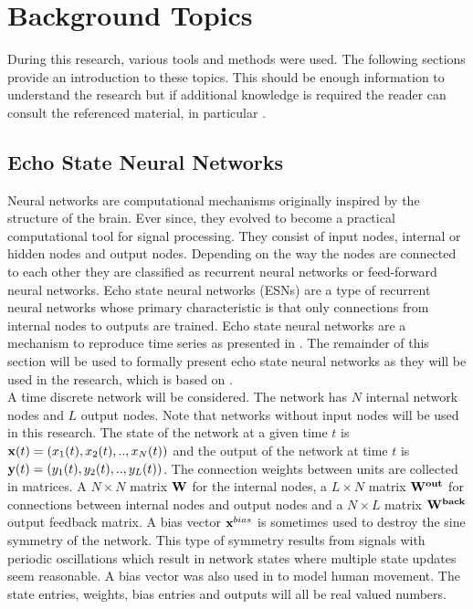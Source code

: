 \documentclass[letterpaper,9pt]{article}
\begin{document}
\section{Background Topics}

During this research, various tools and methods were used. The following sections provide an introduction to these topics. This should be enough information to understand the research but if additional knowledge is required the reader can consult the referenced material, in particular \cite{JaegerESNTutorial}.

\subsection{Echo State Neural Networks}

Neural networks are computational mechanisms originally inspired by the structure of the brain. Ever since, they evolved to become a practical computational tool for signal processing. They consist of input nodes, internal or hidden nodes and output nodes. Depending on the way the nodes are connected to each other they are classified as recurrent neural networks or feed-forward neural networks. Echo state neural networks (ESNs) are a type of recurrent neural networks whose primary characteristic is that only connections from internal nodes to outputs are trained. Echo state neural networks are a mechanism to reproduce time series as presented in \cite{JaegerESNTutorial}. The remainder of this section will be used to formally present echo state neural networks as they will be used in the research, which is based on \cite{JaegerESNTutorial,ESNVerstraeten}.\\

A time discrete network will be considered. The network has $N$ internal network nodes and $L$ output nodes. Note that networks without input nodes will be used in this research. The state of the network at a given time $t$ is ${\bf x}(t)=(x_1(t),x_2(t),..,x_N(t))$ and the output of the network at time $t$ is ${\bf y}(t)=(y_1(t),y_2(t),..,y_L(t))$. The connection weights between units are collected in matrices. A $N \times N$ matrix ${\bf W}$ for the internal nodes, a $L \times N$ matrix ${\bf W^{out}}$ for connections between internal nodes and output nodes and a $N \times L$ matrix ${\bf W^{back}}$ output feedback matrix. A bias vector ${\bf x}^{bias}$ is sometimes used to destroy the sine symmetry of the network. This type of symmetry results from signals with periodic oscillations which result in network states where multiple state updates seem reasonable. A bias vector was also used in \cite{GentHumanMotion} to model human movement. The state entries, weights, bias entries and outputs will all be real valued numbers.\\
\end{document}
